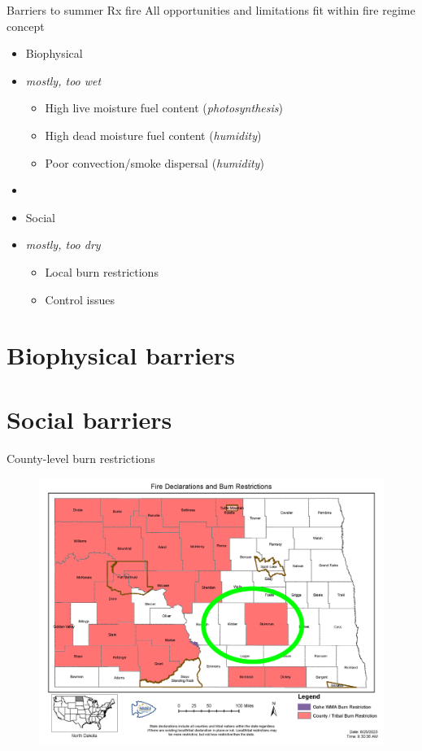 \documentclass[11pt]{beamer}
\begin{document}
\begin{frame}{Barriers to summer Rx fire } 
	All opportunities and limitations fit within fire regime concept
	\begin{itemize}
		\item Biophysical 
		\item[] \emph{mostly, \alert{too wet}}
		\begin{itemize}
			\item High live moisture fuel content (\emph{photosynthesis})
			\item High dead moisture fuel content (\emph{humidity})
			\item Poor convection/smoke dispersal (\emph{humidity})
		\end{itemize}
	\item[]
		\item Social 
		\item[] \emph{mostly, \alert{too dry}}
		\begin{itemize}
			\item Local burn restrictions
			\item Control issues
			\end{itemize}
	\end{itemize}

\end{frame}

\section{Biophysical barriers}

\section{Social barriers}

\begin{frame}{County-level burn restrictions}
	\begin{center}
		\begin{figure}
			\includegraphics[width=1\linewidth]{figs/FireDeclarations.png} 
		\end{figure}
	\end{center}
\end{frame}
\end{document}
